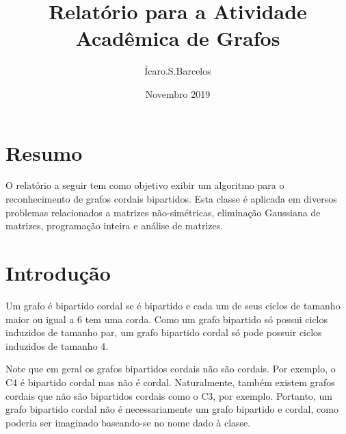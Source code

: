 \documentclass{article}
\title{Relatório para a Atividade Acadêmica de Grafos}
\author{Ícaro.S.Barcelos}
\date{Novembro 2019}
\begin{document}
\maketitle

\section{Resumo}

\setlength{\parindent}{5ex} 

O relatório a seguir tem como objetivo exibir um algoritmo para o reconhecimento de grafos cordais bipartidos. Esta classe é aplicada em diversos problemas relacionados a matrizes não-simétricas, eliminação Gaussiana de matrizes, programação inteira e análise de matrizes.

\pagebreak
\section{Introdução}
\setlength{\parindent}{5ex}
Um grafo é bipartido cordal se é bipartido e cada um de seus ciclos de tamanho maior ou igual a 6 tem uma corda. Como um grafo bipartido só possui ciclos induzidos de tamanho par, um grafo bipartido cordal só pode possuir ciclos induzidos de tamanho 4.\par
Note que em geral os grafos bipartidos cordais não são cordais. Por exemplo, o C4 é bipartido cordal mas não é cordal. Naturalmente, também existem grafos cordais que não são bipartidos cordais como o C3, por exemplo. Portanto, um grafo bipartido cordal não é necessariamente um grafo bipartido e cordal, como poderia ser imaginado baseando-se no nome dado à classe.
\end{document}
